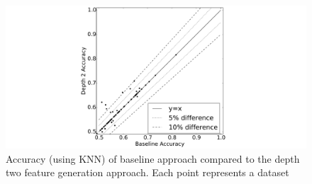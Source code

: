 \documentclass[twoside,11pt]{article}
\theoremstyle{definition}
\begin{document}

\begin{figure}[]
	\centering
	\includegraphics[width=\linewidth]{knn_clean.pdf}
	\caption{Accuracy (using KNN) of baseline approach compared to the depth two feature generation approach. Each point represents a dataset}
	\label{fig:knn_clean}
\end{figure}


\end{document}

